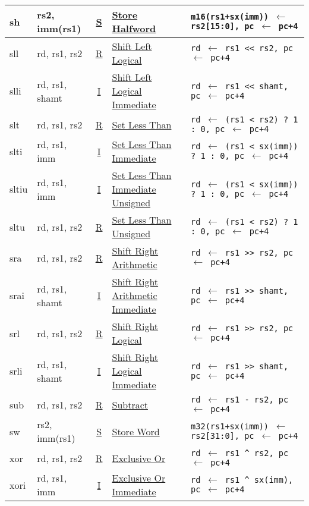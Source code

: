 {\begin{tabular}{|ll|c|l|l|}
\hline
sh    & rs2, imm(rs1) & \hyperref[insnformat:stype]{S} & \hyperref[insn:sh]{Store Halfword}              & {\tt m16(rs1+sx(imm)) $\leftarrow$ rs2[15:0], pc $\leftarrow$ pc+4}\\
\hline
sll   & rd, rs1, rs2   & \hyperref[insnformat:rtype]{R} & \hyperref[insn:sll]{Shift Left Logical}        & {\tt rd $\leftarrow$ rs1 << rs2, pc $\leftarrow$ pc+4}\\
\hline
slli  & rd, rs1, shamt & \hyperref[insnformat:itype]{I} & \hyperref[insn:slli]{Shift Left Logical Immediate} & {\tt rd $\leftarrow$ rs1 << shamt, pc $\leftarrow$ pc+4}\\
\hline
slt   & rd, rs1, rs2   & \hyperref[insnformat:rtype]{R} & \hyperref[insn:slt]{Set Less Than}             & {\tt rd $\leftarrow$ (rs1 < rs2) ? 1 : 0, pc $\leftarrow$ pc+4}\\
\hline
slti  & rd, rs1, imm  & \hyperref[insnformat:itype]{I} & \hyperref[insn:slti]{Set Less Than Immediate}   & {\tt rd $\leftarrow$ (rs1 < sx(imm)) ? 1 : 0, pc $\leftarrow$ pc+4}\\
\hline
sltiu & rd, rs1, imm  & \hyperref[insnformat:itype]{I} & \hyperref[insn:sltiu]{Set Less Than Immediate Unsigned} & {\tt rd $\leftarrow$ (rs1 < sx(imm)) ? 1 : 0, pc $\leftarrow$ pc+4}\\
\hline
sltu  & rd, rs1, rs2   & \hyperref[insnformat:rtype]{R} & \hyperref[insn:sltu]{Set Less Than Unsigned}   & {\tt rd $\leftarrow$ (rs1 < rs2) ? 1 : 0, pc $\leftarrow$ pc+4}\\
\hline
sra   & rd, rs1, rs2   & \hyperref[insnformat:rtype]{R} & \hyperref[insn:sra]{Shift Right Arithmetic}    & {\tt rd $\leftarrow$ rs1 >> rs2, pc $\leftarrow$ pc+4}\\
\hline
srai  & rd, rs1, shamt & \hyperref[insnformat:itype]{I} & \hyperref[insn:srai]{Shift Right Arithmetic Immediate} & {\tt rd $\leftarrow$ rs1 >> shamt, pc $\leftarrow$ pc+4}\\
\hline
srl   & rd, rs1, rs2   & \hyperref[insnformat:rtype]{R} & \hyperref[insn:srl]{Shift Right Logical}       & {\tt rd $\leftarrow$ rs1 >> rs2, pc $\leftarrow$ pc+4}\\
\hline
srli  & rd, rs1, shamt & \hyperref[insnformat:itype]{I} & \hyperref[insn:srli]{Shift Right Logical Immediate} & {\tt rd $\leftarrow$ rs1 >> shamt, pc $\leftarrow$ pc+4}\\
\hline
sub   & rd, rs1, rs2   & \hyperref[insnformat:rtype]{R} & \hyperref[insn:sub]{Subtract}                  & {\tt rd $\leftarrow$ rs1 - rs2, pc $\leftarrow$ pc+4}\\
\hline
sw    & rs2, imm(rs1) & \hyperref[insnformat:stype]{S} & \hyperref[insn:sw]{Store Word}                  & {\tt m32(rs1+sx(imm)) $\leftarrow$ rs2[31:0], pc $\leftarrow$ pc+4}\\
\hline
xor   & rd, rs1, rs2   & \hyperref[insnformat:rtype]{R} & \hyperref[insn:xor]{Exclusive Or}              & {\tt rd $\leftarrow$ rs1 \^{} rs2, pc $\leftarrow$ pc+4}\\
\hline
xori  & rd, rs1, imm  & \hyperref[insnformat:itype]{I} & \hyperref[insn:xori]{Exclusive Or Immediate}    & {\tt rd $\leftarrow$ rs1 \^{} sx(imm), pc $\leftarrow$ pc+4}\\
\hline
\end{tabular}
}
